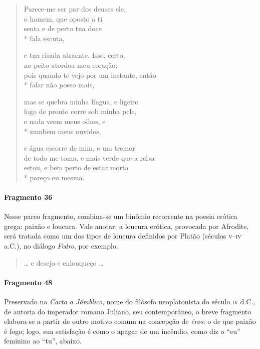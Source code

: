 \begin{verse}
Parece-me ser par dos deuses ele,\\
o homem, que oposto a ti\\
senta e de perto tua doce\\*
fala escuta,

e tua risada atraente. Isso, certo,\\
no peito atordoa meu coração;\\
pois quando te vejo por um instante, então\\*
falar não posso mais,

mas se quebra minha língua, e ligeiro\\
fogo de pronto corre sob minha pele,\\
e nada veem meus olhos, e\\*
zumbem meus ouvidos,

e água escorre de mim, e um tremor\\
de todo me toma, e mais verde que a relva\\
estou, e bem perto de estar morta\\*
pareço eu mesma.
\end{verse}

\paragraph{Fragmento 36}

{\small Nesse parco fragmento, combina-se um binômio recorrente na poesia erótica grega:
paixão e loucura. Vale anotar: a loucura erótica, provocada por Afrodite, será
tratada como um dos tipos de loucura definidos por Platão (séculos \textsc{v}--\textsc{iv} a.C.),
no diálogo \textit{Fedro}, por exemplo.}

\begin{verse}
\ldots{} e desejo e enlouqueço \ldots{}
\end{verse}


\paragraph{Fragmento 48}

{\small Preservado na \textit{Carta a Jâmblico}, nome do filósofo neoplatonista do
século \textsc{iv} d.C., de autoria do imperador romano Juliano, seu contemporâneo, o
breve fragmento elabora-se a partir de outro motivo comum na concepção de
\textit{éros}: o de que paixão é fogo; logo, sua satisfação é como o apagar de
um incêndio, como diz o “eu” feminino ao “tu”, abaixo.}

